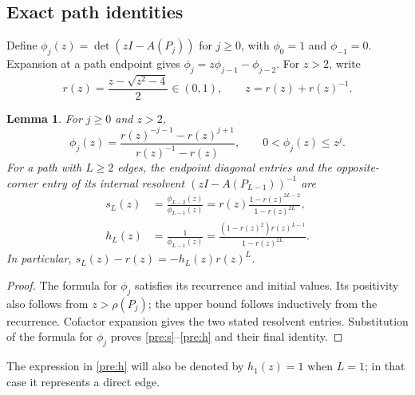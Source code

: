 \documentclass[11pt,a4paper]{article}
\numberwithin{equation}{section}
\newtheorem{lemma}[theorem]{Lemma}
\theoremstyle{definition}
\theoremstyle{remark}
\begin{document}
\subsection{Exact path identities}
Define $\phi_j(z)=\det(zI-A(P_j))$ for $j\ge0$, with $\phi_0=1$ and
$\phi_{-1}=0$. Expansion at a path endpoint gives
$\phi_j=z\phi_{j-1}-\phi_{j-2}$. For $z>2$, write
\[
 r(z)=\frac{z-\sqrt{z^2-4}}2\in(0,1),\qquad z=r(z)+r(z)^{-1}.
\]
\begin{lemma}\label{pre:path}
For $j\ge0$ and $z>2$,
\[
 \phi_j(z)=\frac{r(z)^{-j-1}-r(z)^{j+1}}{r(z)^{-1}-r(z)},
 \qquad 0<\phi_j(z)\le z^j.
\]
For a path with $L\ge2$ edges, the endpoint diagonal entries and the opposite-corner entry
of its internal resolvent $(zI-A(P_{L-1}))^{-1}$ are
\begin{align}
 s_L(z)&=\frac{\phi_{L-2}(z)}{\phi_{L-1}(z)}
 =r(z)\frac{1-r(z)^{2L-2}}{1-r(z)^{2L}},\label{pre:s}\\
 h_L(z)&=\frac1{\phi_{L-1}(z)}
 =\frac{(1-r(z)^2)r(z)^{L-1}}{1-r(z)^{2L}}.\label{pre:h}
\end{align}
In particular, $s_L(z)-r(z)=-h_L(z)r(z)^L$.
\end{lemma}
\begin{proof}
The formula for $\phi_j$ satisfies its recurrence and initial values.
Its positivity also follows from $z>\rho(P_j)$; the upper bound follows
inductively from the recurrence. Cofactor expansion gives the two stated
resolvent entries. Substitution of the formula for $\phi_j$ proves
\eqref{pre:s}--\eqref{pre:h} and their final identity.
\end{proof}
The expression in \eqref{pre:h} will also be denoted by $h_1(z)=1$ when
$L=1$; in that case it represents a direct edge.
\end{document}
